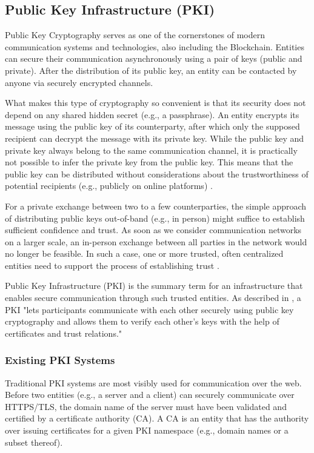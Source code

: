 \subsection{Public Key Infrastructure (PKI)}
\label{subsec:03_pki}

Public Key Cryptography serves as one of the cornerstones of modern communication systems and technologies, also including the Blockchain. Entities can secure their communication asynchronously using a pair of keys (public and private). After the distribution of its public key, an entity can be contacted by anyone via securely encrypted channels.

What makes this type of cryptography so convenient is that its security does not depend on any shared hidden secret (e.g., a passphrase). An entity encrypts its message using the public key of its counterparty, after which only the supposed recipient can decrypt the message with its private key. While the public key and private key always belong to the same communication channel, it is practically not possible to infer the private key from the public key. This means that the public key can be distributed without considerations about the trustworthiness of potential recipients (e.g., publicly on online platforms) \cite{straub_tobias_usability_2006}.

For a private exchange between two to a few counterparties, the simple approach of distributing public keys out-of-band (e.g., in person) might suffice to establish sufficient confidence and trust. As soon as we consider communication networks on a larger scale, an in-person exchange between all parties in the network would no longer be feasible. In such a case, one or more trusted, often centralized entities need to support the process of establishing trust \cite{straub_tobias_usability_2006}.

Public Key Infrastructure (PKI) is the summary term for an infrastructure that enables secure communication through such trusted entities. As described in \cite{straub_tobias_usability_2006}, a PKI "lets participants communicate with each other securely using public key cryptography and allows them to verify each other's keys with the help of certificates and trust relations."


\subsubsection{Existing PKI Systems}

Traditional PKI systems are most visibly used for communication over the web. Before two entities (e.g., a server and a client) can securely communicate over HTTPS/TLS, the domain name of the server must have been validated and certified by a certificate authority (CA). A CA is an entity that has the authority over issuing certificates for a given PKI namespace (e.g., domain names or a subset thereof).

